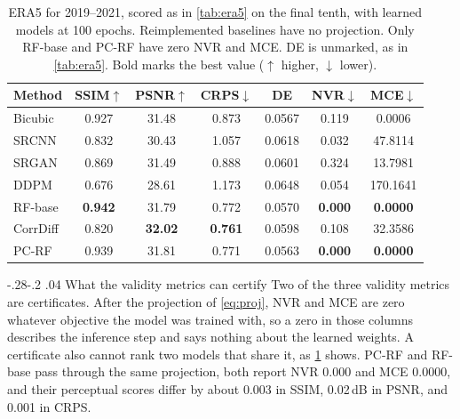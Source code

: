 \documentclass[sigconf,nonacm]{acmart}
\makeatletter
\newcommand{\pcrf}{\textsc{PC-RF}\xspace}
\renewcommand\section{\def\@toclevel{1}%
  \@startsection{section}{1}{\z@}%
  {-.28\baselineskip \@plus -1\p@ \@minus -.2\p@}%
  {.04\baselineskip}%
  {\ACM@NRadjust\@secfont}}
\makeatother
\begin{document}
\begin{table}[t]
\caption{ERA5 for 2019--2021, scored as in \cref{tab:era5} on the final tenth, with learned models at 100 epochs. Reimplemented baselines have no projection. Only RF-base and \pcrf have zero NVR and MCE. DE is unmarked, as in \cref{tab:era5}. Bold marks the best value ($\uparrow$ higher, $\downarrow$ lower).}
\label{tab:era5_3yr}
\centering
\small
\begin{tabular}{lcccccc}
\toprule
\textbf{Method} & SSIM$\uparrow$ & PSNR$\uparrow$ & CRPS$\downarrow$ & DE & NVR$\downarrow$ & MCE$\downarrow$ \\
\midrule
Bicubic & 0.927 & 31.48 & 0.873 & 0.0567 & 0.119 & 0.0006 \\
SRCNN & 0.832 & 30.43 & 1.057 & 0.0618 & 0.032 & 47.8114 \\
SRGAN & 0.869 & 31.49 & 0.888 & 0.0601 & 0.324 & 13.7981 \\
DDPM & 0.676 & 28.61 & 1.173 & 0.0648 & 0.054 & 170.1641 \\
RF-base & \textbf{0.942} & 31.79 & 0.772 & 0.0570 & \textbf{0.000} & \textbf{0.0000} \\
CorrDiff & 0.820 & \textbf{32.02} & \textbf{0.761} & 0.0598 & 0.108 & 32.3586 \\
PC-RF & 0.939 & 31.81 & 0.771 & 0.0563 & \textbf{0.000} & \textbf{0.0000} \\
\bottomrule
\end{tabular}
\end{table}

\section{What the validity metrics can certify}
\label{sec:certify}
Two of the three validity metrics are certificates. After the projection of \cref{eq:proj}, NVR and MCE are zero whatever objective the model was trained with, so a zero in those columns describes the inference step and says nothing about the learned weights. A certificate also cannot rank two models that share it, as \cref{tab:era5_3yr} shows. \pcrf and RF-base pass through the same projection, both report NVR 0.000 and MCE 0.0000, and their perceptual scores differ by about 0.003 in SSIM, 0.02\,dB in PSNR, and 0.001 in CRPS.
\end{document}
